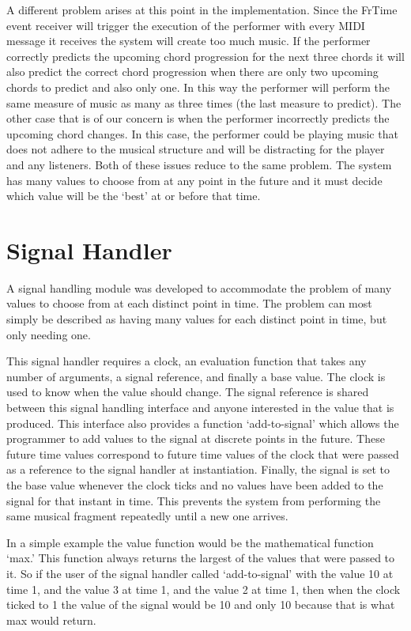 \documentclass[12pt]{ucthesis}
\begin{document}
A different problem arises at this point in the implementation. Since the FrTime event receiver will trigger the execution of the performer with every MIDI message it receives the system will create too much music. If the performer correctly predicts the upcoming chord progression for the next three chords it will also predict the correct chord progression when there are only two upcoming chords to predict and also only one. In this way the performer will perform the same measure of music as many as three times (the last measure to predict). The other case that is of our concern is when the performer incorrectly predicts the upcoming chord changes. In this case, the performer could be playing music that does not adhere to the musical structure and will be distracting for the player and any listeners. Both of these issues reduce to the same problem. The system has many values to choose from at any point in the future and it must decide which value will be the `best' at or before that time.


\section{Signal Handler}
\label {signal-handler}

A signal handling module was developed to accommodate the problem of many values to choose from at each distinct point in time. The problem can most simply be described as having many values for each distinct point in time, but only needing one. 

This signal handler requires a clock, an evaluation function that takes any number of arguments, a signal reference, and finally a base value. The clock is used to know when the value should change. The signal reference is shared between this signal handling interface and anyone interested in the value that is produced. This interface also provides a function `add-to-signal' which allows the programmer to add values to the signal at discrete points in the future. These future time values correspond to future time values of the clock that were passed as a reference to the signal handler at instantiation. Finally, the signal is set to the base value whenever the clock ticks and no values have been added to the signal for that instant in time. This prevents the system from performing the same musical fragment repeatedly until a new one arrives. 

In a simple example the value function would be the mathematical function `max.' This function always returns the largest of the values that were passed to it. So if the user of the signal handler called `add-to-signal' with the value 10 at time 1, and the value 3 at time 1, and the value 2 at time 1, then when the clock ticked to 1 the value of the signal would be 10 and only 10 because that is what max would return. 
\end{document}
